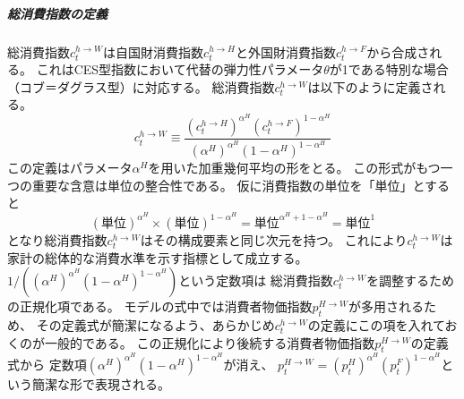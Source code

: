 \subparagraph{総消費指数の定義}
\label{sec:model_households_indices_aggregation_stage1b_home_c_h_W}
総消費指数\(c_t^{h\to W}\)は自国財消費指数\(c_t^{h\to H}\)と外国財消費指数\(c_t^{h\to F}\)から合成される。
これはCES型指数において代替の弾力性パラメータ\(\theta\)が1である特別な場合（コブ＝ダグラス型）に対応する。
総消費指数\(c_t^{h\to W}\)は以下のように定義される。
\begin{equation}
\label{form:model_households_indices_aggregation_stage1b_home_c_h_W_def}
    c_t^{h\to W}\equiv\frac{(c_t^{h\to H})^{\alpha^H}(c_t^{h\to F})^{1-\alpha^H}}{(\alpha^H)^{\alpha^H}(1-\alpha^H)^{1-\alpha^H}}
\end{equation}
この定義はパラメータ\(\alpha^H\)を用いた加重幾何平均の形をとる。
この形式がもつ一つの重要な含意は単位の整合性である。
仮に消費指数の単位を「単位」とすると
\begin{equation}
\label{form:model_households_indices_aggregation_stage1b_home_c_h_W_unit_id}
    (\text{単位})^{\alpha^H}\times(\text{単位})^{1-\alpha^H}=\text{単位}^{\alpha^H+1-\alpha^H}=\text{単位}^1
\end{equation}
となり総消費指数\(c_t^{h\to W}\)はその構成要素と同じ次元を持つ。
これにより\(c_t^{h\to W}\)は家計の総体的な消費水準を示す指標として成立する。
\(1/\left((\alpha^H)^{\alpha^H}(1-\alpha^H)^{1-\alpha^H}\right)\)という定数項は
総消費指数\(c_t^{h\to W}\)を調整するための正規化項である。
モデルの式中では消費者物価指数\(p_t^{H\to W}\)が多用されるため、
その定義式が簡潔になるよう、あらかじめ\(c_t^{h\to W}\)の定義にこの項を入れておくのが一般的である。
この正規化により後続する消費者物価指数\(p_t^{H\to W}\)の定義式から
定数項\((\alpha^H)^{\alpha^H}(1-\alpha^H)^{1-\alpha^H}\)が消え、
\(p_t^{H\to W}=(p_t^H)^{\alpha^H}(p_t^F)^{1-\alpha^H}\)という簡潔な形で表現される。

